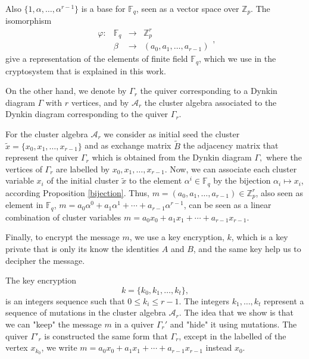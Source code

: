 \documentclass[12pt,a4paper]{article}
\begin{document}
Also $\lbrace 1,\alpha,\ldots, \alpha^{r-1} \rbrace$ is a base for $\mathbb{F}_q$, seen as a vector space  over  $\mathbb{Z}_p$. The isomorphism
\begin{equation}
\begin{array}{rlcl}
\varphi: & \mathbb{F}_q & \rightarrow & \mathbb{Z}^r_p \\
    & \beta & \rightarrow & (a_0,a_1,\ldots, a_{r-1})
\end{array},
\label{eq3}
\end{equation} give a representation of the elements of finite field $\mathbb{F}_q$, which we use in the cryptosystem  that is  explained in this work.

On the other hand, we denote by $\Gamma_r$ the quiver corresponding to a Dynkin diagram $\Gamma$ with $r$ vertices,  and by  $\mathcal{A}_{r}$  the cluster algebra associated to the Dynkin diagram corresponding to the quiver $\Gamma_r$.

For the cluster algebra  $\mathcal{A}_r$ we consider as initial seed the cluster $\tilde{x}=\lbrace x_0,x_1,\ldots,x_{r-1} \rbrace$ and as exchange matrix $\tilde{B}$ the adjacency matrix that represent  the quiver $\Gamma_r$ which is obtained from the Dynkin diagram $\Gamma,$  where the vertices of $\Gamma_r$ are labelled by $x_0,x_1,\ldots,x_{r-1}$. Now, we can associate each cluster variable  $x_i$ of the initial cluster $\tilde{x}$ to the element $\alpha^i \in \mathbb{F}_q$ by the bijection $\alpha_i\mapsto x_i$,  according  Proposition \ref{bijection}.
Thus,  $m=(a_0,a_1,\ldots,a_{r-1}) \in \mathbb{Z}_p^r$, also seen as element in $\mathbb{F}_q$, $m= a_0\alpha^0+a_1\alpha^1 + \cdots + a_{r-1}\alpha^{r-1}$, can be seen as a linear combination of cluster variables $m= a_0x_0+a_1x_1 + \cdots + a_{r-1}x_{r-1}$.

Finally, to encrypt the message $m$, we use a key encryption, $k$, which is a key private that is only its know the identities $A$ and $B$, and the same key help us to decipher the message.

The key encryption
\begin{equation}
k=\{k_0,k_1,\ldots,k_t \},
\label{eq6}
\end{equation}
is an integers sequence such that $0 \leq k_i \leq r-1$. The integers $k_1,\ldots, k_{t}$ represent a sequence of mutations in the cluster algebra $\mathcal{A}_r$.  The idea that we show is that we  can "keep" the message $m$ in a quiver $\Gamma_r'$ and "hide" it using mutations. The quiver $\Gamma'_r$ is constructed the same form that $\Gamma_r$, except in the labelled of the vertex $x_{k_0}$, we write $m=a_0x_0+a_1x_1 + \cdots + a_{r-1}x_{r-1}$ instead  $x_0$. 
\end{document}
